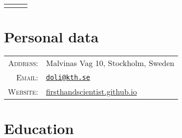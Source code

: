 \documentclass[a4paper,10pt]{article}
\begin{document}
\pagestyle{empty}


\begin{center}
  \begin{tabular}{lcr}
    \par{\centering{\Huge Dong Liu}\bigskip\par} & & %
  \end{tabular}
\end{center}

\section{Personal data}

\begin{tabular}{rl}
  \textsc{Address:} & Malvinas Vag 10, Stockholm, Sweden \\
  \textsc{Email:} & \href{mailto:doli@kth.se}{\nolinkurl{doli@kth.se}} \\
  \textsc{Website:} & \href{https://firsthandscientist.github.io}{firsthandscientist.github.io}\\
\end{tabular}


\section{Education}
\end{document}
